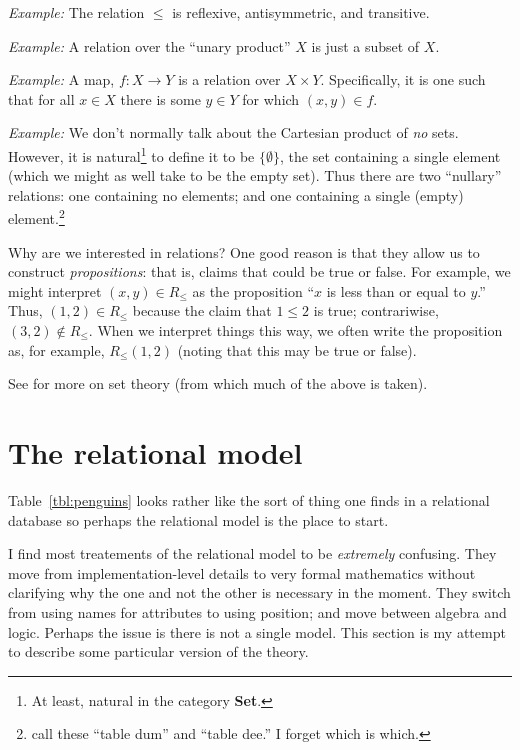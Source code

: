 \documentclass[10pt, a4paper, twocolumn]{article}
\begin{document}
\emph{Example:} The relation $\leq$ is reflexive, antisymmetric, and transitive.

\emph{Example:} A relation over the ``unary product'' $X$ is just a subset of
$X$.

\emph{Example:} A map, $f:X\to Y$ is a relation over $X\times Y$. Specifically, it is
one such that for all $x\in X$ there is some $y\in Y$ for which $(x, y)\in f$.

\emph{Example:} We don't normally talk about the Cartesian product of \emph{no}
sets. However, it is natural\footnote{At least, natural in the category
\textbf{\textsf{Set}}.} to define it to be $\{\emptyset\}$, the set containing a single
element (which we might as well take to be the empty set). Thus there are two
``nullary'' relations: one containing no elements; and one containing a single
(empty) element.\footnote{\textcite{darwendate2006ttm} call these ``table dum''
and ``table dee.'' I forget which is which.}

Why are we interested in relations? One good reason is that they allow us to
construct \emph{propositions}: that is, claims that could be true or false. For
example, we might interpret $(x, y)\in R_\leq$ as the proposition ``$x$ is less than
or equal to $y$.'' Thus, $(1, 2)\in R_\leq$ because the claim that $1\leq 2$ is true;
contrariwise, $(3, 2)\notin R_\leq$. When we interpret things this way, we often write
the proposition as, for example, $R_\leq(1, 2)$ (noting that this may be true or
false).

See \textcite{cameron1999sets} for more on set theory (from which much of the
above is taken).


\section{The relational model}

Table~\ref{tbl:penguins} looks rather like the sort of thing one finds in a
relational database so perhaps the relational model is the place to start.

I find most treatements of the relational model to be \emph{extremely}
confusing. They move from implementation-level details to very formal
mathematics without clarifying why the one and not the other is necessary in the
moment. They switch from using names for attributes to using position; and move
between algebra and logic. Perhaps the issue is there is not a single
model. This section is my attempt to describe some particular version of the
theory.
\end{document}
